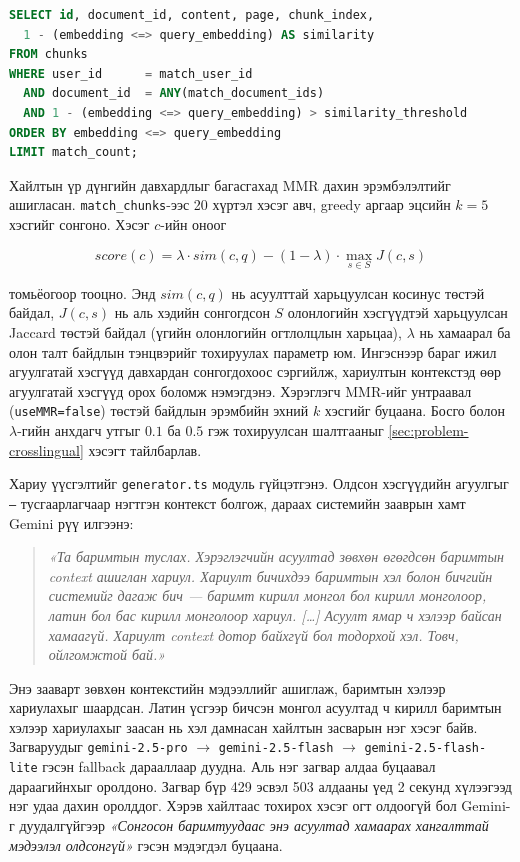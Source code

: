 \documentclass[../main.tex]{subfiles}
\begin{document}
\begin{lstlisting}[language=SQL, caption={match\_chunks функцийн гол хэсэг (001\_schema.sql)}, label={lst:matchchunks}]
SELECT id, document_id, content, page, chunk_index,
  1 - (embedding <=> query_embedding) AS similarity
FROM chunks
WHERE user_id      = match_user_id
  AND document_id  = ANY(match_document_ids)
  AND 1 - (embedding <=> query_embedding) > similarity_threshold
ORDER BY embedding <=> query_embedding
LIMIT match_count;
\end{lstlisting}

Хайлтын үр дүнгийн давхардлыг багасгахад MMR дахин эрэмбэлэлтийг
ашигласан. \texttt{match\_chunks}-ээс 20 хүртэл хэсэг
авч, greedy аргаар эцсийн $k=5$ хэсгийг сонгоно. Хэсэг $c$-ийн оноог

\[
score(c) = \lambda \cdot sim(c, q) - (1 - \lambda) \cdot \max_{s \in S} J(c, s)
\]

томьёогоор тооцно. Энд $sim(c,q)$ нь асуулттай харьцуулсан косинус төстэй
байдал, $J(c,s)$ нь аль хэдийн сонгогдсон $S$ олонлогийн хэсгүүдтэй
харьцуулсан Jaccard төстэй байдал (үгийн олонлогийн огтлолцлын харьцаа),
$\lambda$ нь хамаарал ба олон талт байдлын тэнцвэрийг тохируулах параметр юм.
Ингэснээр бараг ижил агуулгатай хэсгүүд давхардан сонгогдохоос сэргийлж,
хариултын контекстэд өөр агуулгатай хэсгүүд орох боломж нэмэгдэнэ. Хэрэглэгч
MMR-ийг унтраавал (\texttt{useMMR=false}) төстэй байдлын эрэмбийн эхний $k$ хэсгийг
буцаана. Босго болон $\lambda$-гийн анхдагч утгыг $0.1$ ба $0.5$ гэж
тохируулсан шалтгааныг \ref{sec:problem-crosslingual} хэсэгт тайлбарлав.

Хариу үүсгэлтийг \texttt{generator.ts} модуль гүйцэтгэнэ. Олдсон хэсгүүдийн
агуулгыг \texttt{---} тусгаарлагчаар нэгтгэн контекст болгож, дараах системийн
зааврын хамт Gemini рүү илгээнэ:

\begin{quote}
\emph{«Та баримтын туслах. Хэрэглэгчийн асуултад зөвхөн өгөгдсөн баримтын
context ашиглан хариул. Хариулт бичихдээ баримтын хэл болон бичгийн системийг
дагаж бич --- баримт кирилл монгол бол кирилл монголоор, латин бол бас кирилл
монголоор хариул. [\ldots] Асуулт ямар ч хэлээр байсан хамаагүй. Хариулт
context дотор байхгүй бол тодорхой хэл. Товч, ойлгомжтой бай.»}
\end{quote}

Энэ зааварт зөвхөн контекстийн мэдээллийг ашиглаж, баримтын хэлээр
хариулахыг шаардсан. Латин үсгээр бичсэн монгол асуултад ч кирилл
баримтын хэлээр хариулахыг заасан нь хэл дамнасан хайлтын засварын нэг
хэсэг байв. Загваруудыг
\texttt{gemini-2.5-pro} $\rightarrow$ \texttt{gemini-2.5-flash} $\rightarrow$
\texttt{gemini-2.5-flash-\allowbreak lite} гэсэн fallback дарааллаар дуудна. Аль нэг загвар
алдаа буцаавал дараагийнхыг оролдоно. Загвар бүр 429 эсвэл 503 алдааны
үед 2 секунд хүлээгээд нэг удаа дахин оролддог. Хэрэв хайлтаас тохирох хэсэг
огт олдоогүй бол Gemini-г дуудалгүйгээр \emph{«Сонгосон баримтуудаас энэ
асуултад хамаарах хангалттай мэдээлэл олдсонгүй»} гэсэн мэдэгдэл буцаана.
\end{document}
